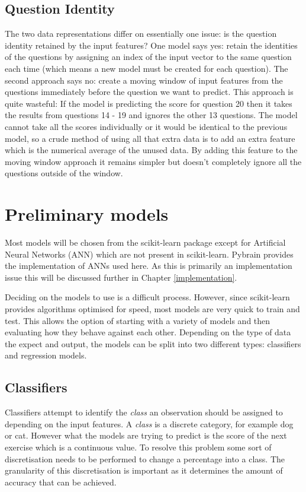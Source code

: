 \subsection{Question Identity}
The two data representations differ on essentially one issue: is the question identity retained by the input features? One model says yes: retain the identities of the questions by assigning an index of the input vector to the same question each time (which means a new model must be created for each question). The second approach says no: create a moving window of input features from the questions immediately before the question we want to predict. This approach is quite wasteful: If the model is predicting the score for question 20 then it takes the results from questions 14 - 19 and ignores the other 13 questions. The model cannot take all the scores individually or it would be identical to the previous model, so a crude method of using all that extra data is to add an extra feature which is the numerical average of the unused data. By adding this feature to the moving window approach it remains simpler but doesn't completely ignore all the questions outside of the window.

\section{Preliminary models}
Most models will be chosen from the scikit-learn package except for Artificial Neural Networks (ANN) which are not present in scikit-learn. Pybrain provides the implementation of ANNs used here. As this is primarily an implementation issue this will be discussed further in Chapter \ref{implementation}.

Deciding on the models to use is a difficult process. However, since scikit-learn provides algorithms optimised for speed, most models are very quick to train and test. This allows the option of starting with a variety of models and then evaluating how they behave against each other. Depending on the type of data the expect and output, the models can be split into two different types: classifiers and regression models.

\subsection{Classifiers}
Classifiers attempt to identify the {\it class} an observation should be assigned to depending on the input features. A {\it class} is a discrete category, for example dog or cat. However what the models are trying to predict is the score of the next exercise which is a continuous value. To resolve this problem some sort of discretisation needs to be performed to change a percentage into a class. The granularity of this discretisation is important as it determines the amount of accuracy that can be achieved. 

